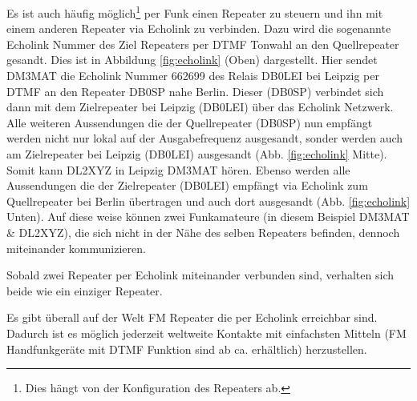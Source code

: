 Es ist auch häufig möglich\footnote{Dies hängt von der Konfiguration des Repeaters ab.} per Funk einen Repeater zu steuern und ihn mit einem anderen Repeater via Echolink zu verbinden. Dazu wird die sogenannte Echolink Nummer des Ziel Repeaters per DTMF Tonwahl an den Quellrepeater gesandt. Dies ist in Abbildung \ref{fig:echolink} (Oben) dargestellt. Hier sendet DM3MAT die Echolink Nummer 662699 des Relais DB0LEI bei Leipzig per DTMF an den Repeater DB0SP nahe Berlin. Dieser (DB0SP) verbindet sich dann mit dem Zielrepeater bei Leipzig (DB0LEI) über das Echolink Netzwerk. Alle weiteren Aussendungen die der Quellrepeater (DB0SP) nun empfängt werden nicht nur lokal auf der Ausgabefrequenz ausgesandt, sonder werden auch am Zielrepeater bei Leipzig (DB0LEI) ausgesandt (Abb. \ref{fig:echolink} Mitte). Somit kann DL2XYZ in Leipzig DM3MAT hören. Ebenso werden alle Aussendungen die der Zielrepeater (DB0LEI) empfängt via Echolink zum Quellrepeater bei Berlin übertragen und auch dort ausgesandt (Abb. \ref{fig:echolink} Unten).  Auf diese weise können zwei Funkamateure (in diesem Beispiel DM3MAT \& DL2XYZ), die sich nicht in der Nähe des selben Repeaters befinden, dennoch miteinander kommunizieren. 

\begin{merke}
Sobald zwei Repeater per Echolink miteinander verbunden sind, verhalten sich beide wie ein einziger Repeater. 
\end{merke}

Es gibt überall auf der Welt FM Repeater die per Echolink erreichbar sind. Dadurch ist es möglich jederzeit weltweite Kontakte mit einfachsten Mitteln (FM Handfunkgeräte mit DTMF Funktion sind ab ca.  erhältlich) herzustellen.